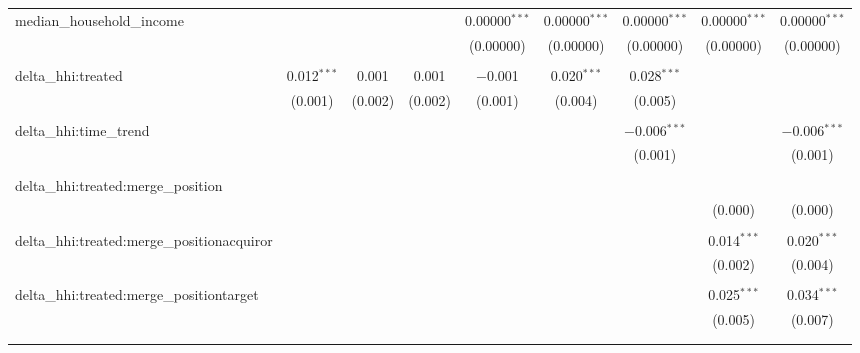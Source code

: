 \begin{table}[H]
{\begin{tabular}{@{\extracolsep{5pt}}lcccccccc}
  median\_household\_income &  &  &  & 0.00000$^{***}$ & 0.00000$^{***}$ & 0.00000$^{***}$ & 0.00000$^{***}$ & 0.00000$^{***}$ \\  

   &  &  &  & (0.00000) & (0.00000) & (0.00000) & (0.00000) & (0.00000) \\  

   & & & & & & & & \\  

  delta\_hhi:treated & 0.012$^{***}$ & 0.001 & 0.001 & $-$0.001 & 0.020$^{***}$ & 0.028$^{***}$ &  &  \\  

   & (0.001) & (0.002) & (0.002) & (0.001) & (0.004) & (0.005) &  &  \\  

   & & & & & & & & \\  

  delta\_hhi:time\_trend &  &  &  &  &  & $-$0.006$^{***}$ &  & $-$0.006$^{***}$ \\  

   &  &  &  &  &  & (0.001) &  & (0.001) \\  

   & & & & & & & & \\  

  delta\_hhi:treated:merge\_position &  &  &  &  &  &  &  &  \\  

   &  &  &  &  &  &  & (0.000) & (0.000) \\  

   & & & & & & & & \\  

  delta\_hhi:treated:merge\_positionacquiror &  &  &  &  &  &  & 0.014$^{***}$ & 0.020$^{***}$ \\  

   &  &  &  &  &  &  & (0.002) & (0.004) \\  

   & & & & & & & & \\  

  delta\_hhi:treated:merge\_positiontarget &  &  &  &  &  &  & 0.025$^{***}$ & 0.034$^{***}$ \\  

   &  &  &  &  &  &  & (0.005) & (0.007) \\  

   & & & & & & & & \\  

 \hline \\[-1.8ex]  


\end{tabular}}
\end{table}
